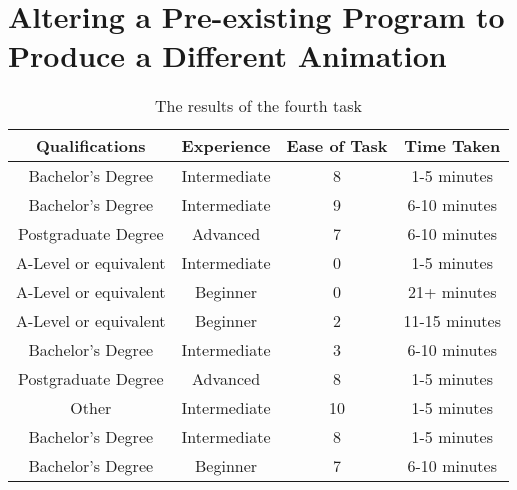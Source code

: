\documentclass[../main.tex]{subfiles}
\begin{document}
        \section*{Altering a Pre-existing Program to Produce a Different Animation}
            \begin{table}[H]
                \centering
                \begin{tabular}{c|c|c|c}
                    \textbf{Qualifications} & \textbf{Experience} & \textbf{Ease of Task} & \textbf{Time Taken} \\
                    \hline
                    Bachelor's Degree       & Intermediate        & 8                     & 1-5 minutes         \\
                    Bachelor's Degree       & Intermediate        & 9                     & 6-10 minutes        \\
                    Postgraduate Degree     & Advanced            & 7                     & 6-10 minutes        \\
                    A-Level or equivalent   & Intermediate        & 0                     & 1-5 minutes         \\
                    A-Level or equivalent   & Beginner            & 0                     & 21+ minutes         \\
                    A-Level or equivalent   & Beginner            & 2                     & 11-15 minutes       \\
                    Bachelor's Degree       & Intermediate        & 3                     & 6-10 minutes        \\
                    Postgraduate Degree     & Advanced            & 8                     & 1-5 minutes         \\
                    Other                   & Intermediate        & 10                    & 1-5 minutes         \\
                    Bachelor's Degree       & Intermediate        & 8                     & 1-5 minutes         \\
                    Bachelor's Degree       & Beginner            & 7                     & 6-10 minutes        \\
                \end{tabular}
                \caption{The results of the fourth task}
            \end{table}
\end{document}
